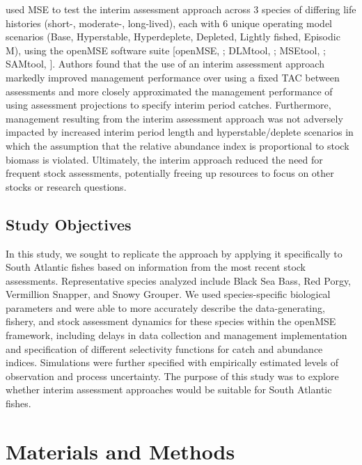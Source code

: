 \documentclass[12pt,english]{article}
\begin{document}
\begin{flushleft}
\begin{spacing}{1.9}
\citet{HuynhEtAl2020} used MSE to test the interim assessment approach across 3 species of differing life histories (short-, moderate-, long-lived), each with 6 unique operating model scenarios (Base, Hyperstable, Hyperdeplete, Depleted, Lightly fished, Episodic M), using the openMSE software suite [openMSE, \cite{openMSE}; DLMtool, \cite{DLMtool}; MSEtool, \cite{MSEtool}; SAMtool, \cite{SAMtool}]. Authors found that the use of an interim assessment approach markedly improved management performance over using a fixed TAC between assessments and more closely approximated the management performance of using assessment projections to specify interim period catches. Furthermore, management resulting from the interim assessment approach was not adversely impacted by increased interim period length and hyperstable/deplete scenarios in which the assumption that the relative abundance index is proportional to stock biomass is violated. Ultimately, the interim approach reduced the need for frequent stock assessments, potentially freeing up resources to focus on other stocks or research questions.

\subsection*{Study Objectives}
In this study, we sought to replicate the \citet{HuynhEtAl2020} approach by applying it specifically to South Atlantic fishes based on information from the most recent stock assessments. Representative species analyzed include Black Sea Bass, Red Porgy, Vermillion Snapper, and Snowy Grouper. We used species-specific biological parameters and were able to more accurately describe the data-generating, fishery, and stock assessment dynamics for these species within the openMSE framework, including delays in data collection and management implementation \citep{ShertzerPrager2007} and specification of different selectivity functions for catch and abundance indices. Simulations were further specified with empirically estimated levels of observation and process uncertainty. The purpose of this study was to explore whether interim assessment approaches would be suitable for South Atlantic fishes.

\section*{Materials and Methods}


\end{spacing}
\end{flushleft}
\end{document}
